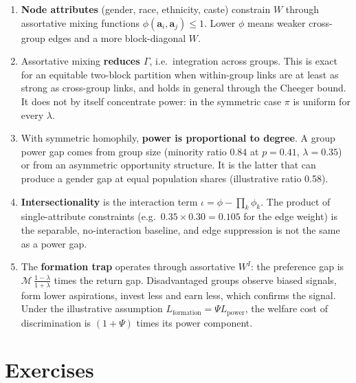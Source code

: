\documentclass[../structural_economics_book.tex]{subfiles}
\begin{document}
\begin{enumerate}
\item \textbf{Node attributes} (gender, race, ethnicity, caste) constrain $W$ through assortative mixing functions $\phi(\mathbf{a}_i, \mathbf{a}_j) \leq 1$. Lower $\phi$ means weaker cross-group edges and a more block-diagonal $W$.

\item Assortative mixing \textbf{reduces $\Gamma$}, i.e.\ integration across groups. This is exact for an equitable two-block partition when within-group links are at least as strong as cross-group links, and holds in general through the Cheeger bound. It does not by itself concentrate power: in the symmetric case $\pi$ is uniform for every $\lambda$.

\item With symmetric homophily, \textbf{power is proportional to degree}. A group power gap comes from group size (minority ratio $0.84$ at $p = 0.41$, $\lambda = 0.35$) or from an asymmetric opportunity structure. It is the latter that can produce a gender gap at equal population shares (illustrative ratio 0.58).

\item \textbf{Intersectionality} is the interaction term $\iota = \phi - \prod_k\phi_k$. The product of single-attribute constraints (e.g.\ $0.35 \times 0.30 = 0.105$ for the edge weight) is the separable, no-interaction baseline, and edge suppression is not the same as a power gap.

\item The \textbf{formation trap} operates through assortative $W^I$: the preference gap is $\mathcal{M}\,\frac{1-\lambda}{1+\lambda}$ times the return gap. Disadvantaged groups observe biased signals, form lower aspirations, invest less and earn less, which confirms the signal. Under the illustrative assumption $L_{\text{formation}} = \Psi L_{\text{power}}$, the welfare cost of discrimination is $(1 + \Psi)$ times its power component.
\end{enumerate}


\section{Exercises}
\label{ch18:sec:exercises}
\end{document}

